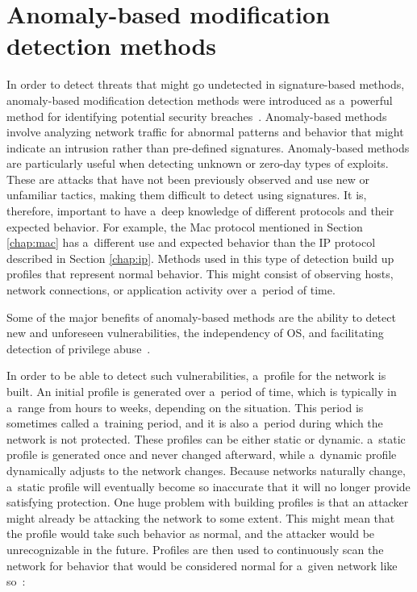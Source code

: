 \documentclass[
  printed,     %
  color,       %
  oneside,     %
  nosansbold,  %
  nocolorbold, %
  nolof,         %
  nolot,         %
]{fithesis4}
\begin{document}
\section{Anomaly-based modification detection methods}

In order to detect threats that might go undetected in signature-based methods, anomaly-based modification detection methods were introduced as a~powerful method for identifying potential security breaches~\cite{gtidaps}. Anomaly-based methods involve analyzing network traffic for abnormal patterns and behavior that might indicate an intrusion rather than pre-defined signatures. Anomaly-based methods are particularly useful when detecting unknown or zero-day types of exploits. These are attacks that have not been previously observed and use new or unfamiliar tactics, making them difficult to detect using signatures. It is, therefore, important to have a~deep knowledge of different protocols and their expected behavior. For example, the Mac protocol mentioned in Section \ref{chap:mac} has a~different use and expected behavior than the IP protocol described in Section \ref{chap:ip}. Methods used in this type of detection build up profiles that represent normal behavior. This might consist of observing hosts, network connections, or application activity over a~period of time. 

Some of the major benefits of anomaly-based methods are the ability to detect new and unforeseen vulnerabilities, the independency of OS, and facilitating detection of privilege abuse~\cite{LIAO201316}. 

In order to be able to detect such vulnerabilities, a~profile for the network is built. An initial profile is generated over a~period of time, which is typically in a~range from hours to weeks, depending on the situation. This period is sometimes called a~training period, and it is also a~period during which the network is not protected. These profiles can be either static or dynamic. a~static profile is generated once and never changed afterward, while a~dynamic profile dynamically adjusts to the network changes. Because networks naturally change, a~static profile will eventually become so inaccurate that it will no longer provide satisfying protection. One huge problem with building profiles is that an attacker might already be attacking the network to some extent. This might mean that the profile would take such behavior as normal, and the attacker would be unrecognizable in the future. Profiles are then used to continuously scan the network for behavior that would be considered normal for a~given network like so~\cite{gtidaps}:
\end{document}
